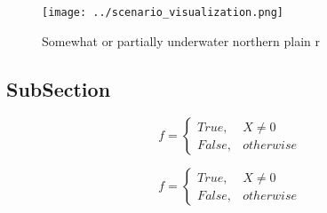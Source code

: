 \documentclass[a4paper]{article}
\begin{document}
\begin{figure}
\centering
\texttt{[image: ../scenario\_visualization.png]}
\caption{Somewhat or partially underwater northern plain r
}
\end{figure}
 
\subsection{SubSection}

\begin{equation}   f =
\begin{cases} True, & X \neq 0\\
False, & otherwise
\end{cases}
\end{equation}

\begin{equation}   f =
\begin{cases} True, & X \neq 0\\
False, & otherwise
\end{cases}
\end{equation}
\end{document}
